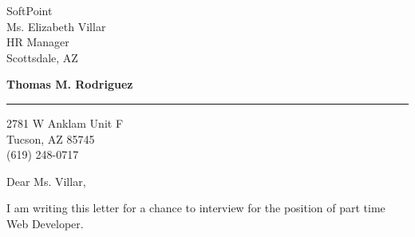 \documentclass{letter} %
\begin{document}
\signature{Thomas M. Rodriguez}           %
\longindentation=0pt                       %
\let\raggedleft\raggedright                %
 
 
\begin{letter}{
SoftPoint \\
Ms. Elizabeth Villar \\
HR Manager \\
Scottsdale, AZ}

\begin{center}
{\large\bf Thomas M. Rodriguez}
\end{center}
\medskip\hrule height 1pt
\begin{center}
{2781 W Anklam Unit F \\ Tucson, AZ 85745 \\ (619) 248-0717}
\end{center} \vfill %
 
 
\opening{Dear Ms. Villar,}
 

\noindent I am writing this letter for a chance to interview for the position of part time Web Developer.
 


\end{letter}
\end{document}
